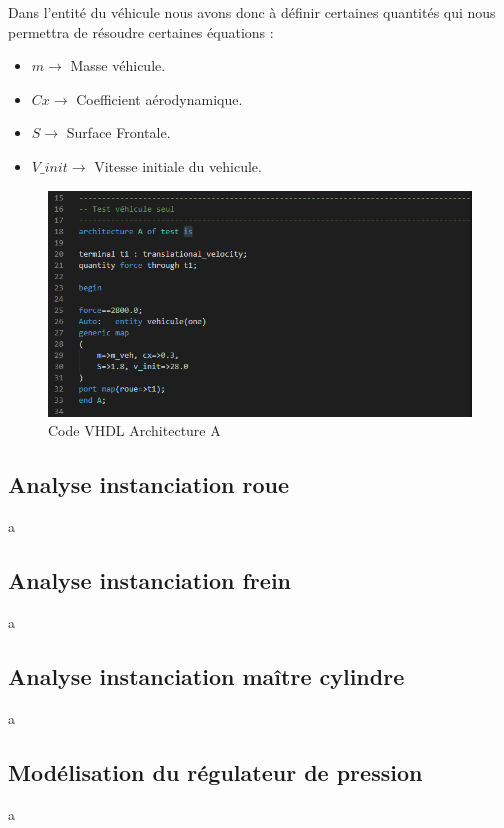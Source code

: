 Dans l'entité du véhicule nous avons donc à définir certaines quantités qui nous permettra de résoudre certaines équations :\\

\begin{itemize}
        \item $m        \rightarrow$ Masse véhicule.
        \item $Cx       \rightarrow$ Coefficient aérodynamique.
        \item $S        \rightarrow$ Surface Frontale.
        \item $V\_init  \rightarrow$ Vitesse initiale du vehicule.
\end{itemize}

\begin{figure}[h]
    \centering
    \includegraphics[width=\textwidth]{images/vehicule.png}
    \caption{Code VHDL Architecture A}
\end{figure}

\subsection{Analyse instanciation roue}
a
\subsection{Analyse instanciation frein}
a
\subsection{Analyse instanciation maître cylindre}
a
\subsection{Modélisation du régulateur de pression}
a
\newpage